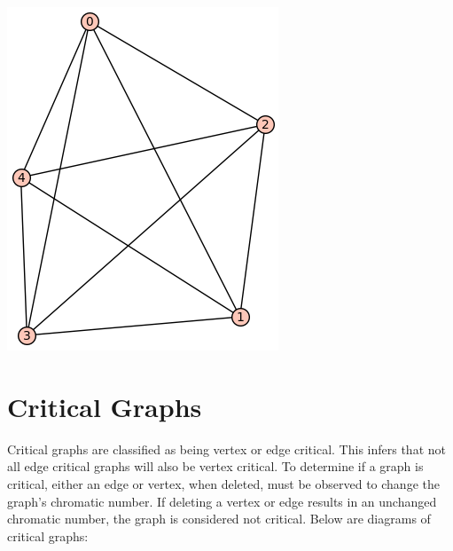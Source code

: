 \documentclass[12pt, letterpaper, twoside]{article}
\begin{document}
\includegraphics[scale=.35]{test}

\section{Critical Graphs}
Critical graphs are classified as being vertex or edge critical. This infers that not all edge critical graphs will also be vertex critical. To determine if a graph is critical, either an edge or vertex, when deleted, must be observed to change the graph's chromatic number. 
If deleting a vertex or edge results in an unchanged chromatic number, the graph is considered not critical.
Below are diagrams of critical graphs:
\end{document}
